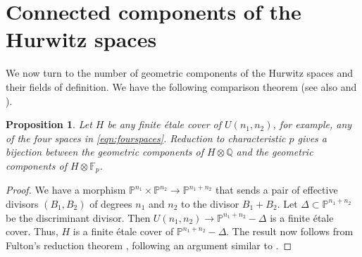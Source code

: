 \documentclass{amsart}
\numberwithin{equation}{section} \numberwithin{figure}{section}
\newcommand\FF{\mathbb{F}}
\newcommand\PP{\mathbb{P}}
\newcommand\QQ{\mathbb{Q}}
\theoremstyle{one}
\newtheorem{proposition}[theorem]{\textbf{Proposition}}
\theoremstyle{definition}
\begin{document}
\section{Connected components of the Hurwitz spaces}\label{sec:comphurwitz}
We now turn to the number of geometric components of the Hurwitz spaces and their fields of definition.
We have the following comparison theorem (see also \cite[Lemma~2.3.5]{lan.lev:25-1} and \cite[Lemma~10.3]{liu.woo.zur:24}).
\begin{proposition}\label{prop:components-complex}
  Let \(H\) be any finite \'etale cover of \(U(n_1,n_2)\), for example, any of the four spaces in \eqref{eqn:fourspaces}. 
  Reduction to characteristic \(p\) gives a bijection between the geometric components of \(H \otimes \QQ\) and the geometric components of \(H \otimes \FF_p\).
\end{proposition}
\begin{proof}
  We have a morphism \(\PP^{n_1} \times \PP^{n_2} \to \PP^{n_1+n_2}\) that sends a pair of effective divisors \((B_1,B_2)\) of degrees \(n_1\) and \(n_2\) to the divisor \(B_1 + B_2\).
  Let \(\Delta \subset \PP^{n_1+n_2}\) be the discriminant divisor.
  Then \(U(n_1,n_2) \to \PP^{n_1+n_2} - \Delta\) is a finite \'etale cover.
  Thus, \(H\) is a finite \'etale cover of \(\PP^{n_1+n_2} - \Delta\).
  The result now follows from Fulton's reduction theorem \cite[Theorem~3.3, Lemma~A.3]{ful:69}, following an argument similar to \cite[Corollary 7.5]{ful:69}.
\end{proof}
\end{document}
